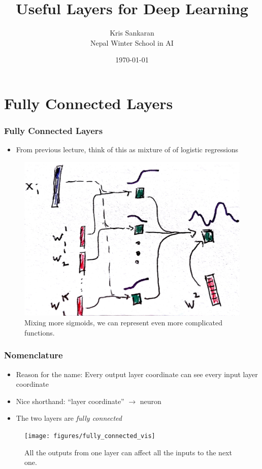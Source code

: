 \documentclass[10pt,mathserif]{beamer}
\title{\large \bfseries Useful Layers for Deep Learning}
\author{Kris Sankaran\\[3ex] Nepal Winter School in AI}
\date{\today}
\begin{document}
\maketitle

\section{Fully Connected Layers}

\begin{frame}
  \frametitle{Fully Connected Layers}
  \begin{itemize}
  \item From previous lecture, think of this as mixture of of logistic
    regressions
  \end{itemize}
  \begin{figure}
    \centering
    \includegraphics[width=0.55\paperwidth]{figure/mixture_logistic_k}
    \caption{Mixing more sigmoids, we can represent even more complicated
      functions. \label{fig:mixture_logistic_k} }
  \end{figure}
\end{frame}

\begin{frame}
  \frametitle{Nomenclature}
  \begin{itemize}
  \item Reason for the name: Every output layer coordinate can see every input
    layer coordinate
  \item Nice shorthand: ``layer coordinate'' $\rightarrow$ neuron
  \item The two layers are \textit{fully connected}
  \end{itemize}
\begin{figure}
  \centering
  \texttt{[image: figures/fully\_connected\_vis]}
  \caption{All the outputs from one layer can affect all the inputs to the next
    one. \label{fig:fully_connected}}
\end{figure}
\end{frame}
\end{document}
